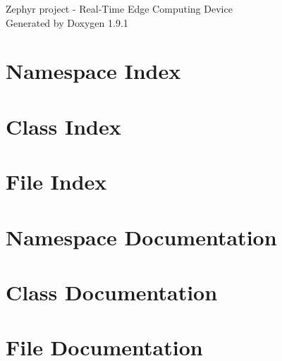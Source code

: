 \let\mypdfximage\pdfximage\def\pdfximage{\immediate\mypdfximage}\documentclass[twoside]{book}
\newcommand{\+}{\discretionary{\mbox{\scriptsize$\hookleftarrow$}}{}{}}
\newcommand{\clearemptydoublepage}{%
  \newpage{\pagestyle{empty}\cleardoublepage}%
}
\begin{document}
\raggedbottom

\hypersetup{pageanchor=false,
             bookmarksnumbered=true,
             pdfencoding=unicode
            }
\begin{titlepage}
\vspace*{7cm}
\begin{center}%
{\Large Zephyr project -\/ Real-\/\+Time Edge Computing Device }\\
\vspace*{1cm}
{\large Generated by Doxygen 1.9.1}\\
\end{center}
\end{titlepage}
\clearemptydoublepage
{}
\tableofcontents
\clearemptydoublepage
{}
\hypersetup{pageanchor=true}

\chapter{Namespace Index}

\chapter{Class Index}

\chapter{File Index}

\chapter{Namespace Documentation}


\chapter{Class Documentation}



\chapter{File Documentation}
















\backmatter
\newpage
{}
\clearemptydoublepage
{}
\printindex
\end{document}
